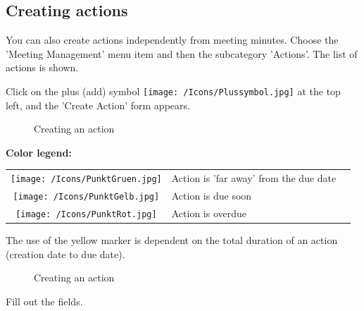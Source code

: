 \subsection{Creating actions}

You can also create actions independently from meeting minutes. Choose the 'Meeting Management' menu item and then the subcategory 'Actions'. The list of actions is shown.

\vspace{\baselineskip}

Click on the plus (add) symbol \texttt{[image: /Icons/Plussymbol.jpg]}  at the top left, and the 'Create Action' form appears.

\begin{figure}[H]
\caption{Creating an action}
\end{figure}

\textbf{Color legend:}

\begin{tabular}{c p{14cm} l} %
\texttt{[image: /Icons/PunktGruen.jpg]} & Action is 'far away' from the due date \\
\texttt{[image: /Icons/PunktGelb.jpg]} & Action is due soon \\
\texttt{[image: /Icons/PunktRot.jpg]} & Action is overdue \\
\end{tabular}

\vspace{\baselineskip}

The use of the yellow marker is dependent on the total duration of an action (creation date to due date).

\begin{figure}[H]
\caption{Creating an action}
\end{figure}

Fill out the fields.

